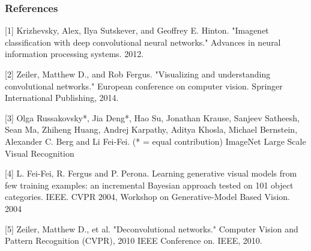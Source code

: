 \documentclass{article} %
\begin{document}
	\subsubsection*{References}
	
	\small{
		[1] Krizhevsky, Alex, Ilya Sutskever, and Geoffrey E. Hinton. "Imagenet classification with deep convolutional neural networks." Advances in neural information processing systems. 2012.
		
		[2] Zeiler, Matthew D., and Rob Fergus. "Visualizing and understanding convolutional networks." European conference on computer vision. Springer International Publishing, 2014.
		
		[3] Olga Russakovsky*, Jia Deng*, Hao Su, Jonathan Krause, Sanjeev Satheesh, Sean Ma, Zhiheng Huang, Andrej Karpathy, Aditya Khosla, Michael Bernstein, Alexander C. Berg and Li Fei-Fei. (* = equal contribution) ImageNet Large Scale Visual Recognition 
		
		[4] L. Fei-Fei, R. Fergus and P. Perona. Learning generative visual models
		from few training examples: an incremental Bayesian approach tested on
		101 object categories. IEEE. CVPR 2004, Workshop on Generative-Model
		Based Vision. 2004
		
		[5] Zeiler, Matthew D., et al. "Deconvolutional networks." Computer Vision and Pattern Recognition (CVPR), 2010 IEEE Conference on. IEEE, 2010.
	}
	
\end{document}
